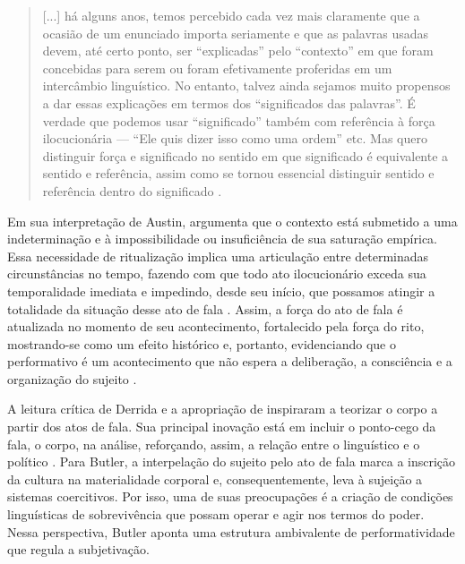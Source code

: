 \documentclass[portuguese]{textolivre}
\begin{document}
\begin{quote}
    [...] há alguns anos, temos percebido cada vez mais claramente que a ocasião de um enunciado importa seriamente e que as palavras usadas devem, até certo ponto, ser “explicadas” pelo “contexto” em que foram concebidas para serem ou foram efetivamente proferidas em um intercâmbio linguístico. No entanto, talvez ainda sejamos muito propensos a dar essas explicações em termos dos “significados das palavras”. É verdade que podemos usar “significado” também com referência à força ilocucionária — “Ele quis dizer isso como uma ordem” etc. Mas quero distinguir força e significado no sentido em que significado é equivalente a sentido e referência, assim como se tornou essencial distinguir sentido e referência dentro do significado \cite[p. 100]{austin1962how}.
\end{quote}

Em sua interpretação de Austin, \textcite[p. 29]{derrida1990limited} argumenta que o contexto está submetido a uma indeterminação e à impossibilidade ou insuficiência de sua saturação empírica. Essa necessidade de ritualização implica uma articulação entre determinadas circunstâncias no tempo, fazendo com que todo ato ilocucionário exceda sua temporalidade imediata e impedindo, desde seu início, que possamos atingir a totalidade da situação desse ato de fala \cite{butler1997excitable}. Assim, a força do ato de fala é atualizada no momento de seu acontecimento, fortalecido pela força do rito, mostrando-se como um efeito histórico \cite{butler1997excitable} e, portanto, evidenciando que o performativo é um acontecimento que não espera a deliberação, a consciência e a organização do sujeito \cite{pinto2009corpo}.

A leitura crítica de Derrida e a apropriação de \textcite{felman1980scandale} inspiraram \textcite{butler1997excitable} a teorizar o corpo a partir dos atos de fala. Sua principal inovação está em incluir o ponto-cego da fala, o corpo, na análise, reforçando, assim, a relação entre o linguístico e o político \cite{pinto2009corpo}. Para Butler, a interpelação do sujeito pelo ato de fala marca a inscrição da cultura na materialidade corporal e, consequentemente, leva à sujeição a sistemas coercitivos. Por isso, uma de suas preocupações é a criação de condições linguísticas de sobrevivência que possam operar e agir nos termos do poder. Nessa perspectiva, Butler aponta uma estrutura ambivalente de performatividade que regula a subjetivação.
\end{document}
